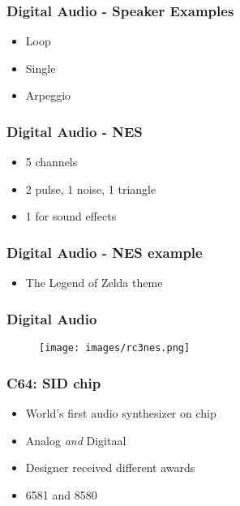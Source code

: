 
\begin{frame}
\frametitle{Digital Audio - Speaker Examples}

\begin{itemize}
\item Loop
\item Single
\item Arpeggio
\end{itemize}

\end{frame}


\begin{frame}
\frametitle{Digital Audio - NES}

\begin{itemize}
\item 5 channels
\item 2 pulse, 1 noise, 1 triangle
\item 1 for sound effects
\end{itemize}

\end{frame}


\begin{frame}
\frametitle{Digital Audio - NES example}

\begin{itemize}
\item The Legend of Zelda theme
\end{itemize}

\end{frame}


\begin{frame}
\frametitle{Digital Audio}

\begin{figure}
\texttt{[image: images/rc3nes.png]}
\end{figure}

\end{frame}


\begin{frame}
\frametitle{C64: SID chip}

\begin{itemize}
\item World's first audio synthesizer on chip
\item Analog \emph{and} Digitaal
\item Designer received different awards
\item 6581 and 8580
\end{itemize}

\end{frame}

